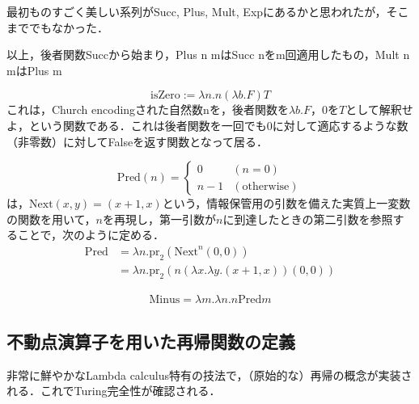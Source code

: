 \documentclass[uplatex, 12pt, dvipdfmx]{jsreport}
\begin{document}
\begin{screen}
    最初ものすごく美しい系列がSucc, Plus, Mult, Expにあるかと思われたが，そこまででもなかった．

    以上，後者関数Succから始まり，Plus n mはSucc nをm回適用したもの，Mult n mはPlus m
\end{screen}

\begin{definition}[0判定真理値関数]
    \[ \mathrm{isZero} := \lambda n.n(\lambda b.F)T \]
    これは，Church encodingされた自然数nを，後者関数を$\lambda b.F$，0を$T$として解釈せよ，という関数である．これは後者関数を一回でも0に対して適応するような数（非零数）に対してFalseを返す関数となって居る．
\end{definition}

\begin{definition}[前者関数]
    \[\mathrm{Pred}(n)=\begin{cases}
        0 & (n=0)\\
        n-1 & \mathrm{(otherwise)}
    \end{cases}\]
    は，$\mathrm{Next}(x,y)=(x+1,x)$という，情報保管用の引数を備えた実質上一変数の関数を用いて，$n$を再現し，第一引数が$n$に到達したときの第二引数を参照することで，次のように定める．
    \begin{align*}
        \mathrm{Pred} &= \lambda n.\mathrm{pr}_2(\mathrm{Next}^n(0,0)) \\
        &= \lambda n.\mathrm{pr}_2(n(\lambda x.\lambda y.(x+1,x))(0,0))
    \end{align*}
\end{definition}
\begin{definition}[減算]
    \begin{align*}
        \mathrm{Minus} = \lambda m.\lambda n.n\mathrm{Pred}m
    \end{align*}
\end{definition}

\subsection{不動点演算子を用いた再帰関数の定義}
非常に鮮やかなLambda calculus特有の技法で，（原始的な）再帰の概念が実装される．これでTuring完全性が確認される．
\end{document}
